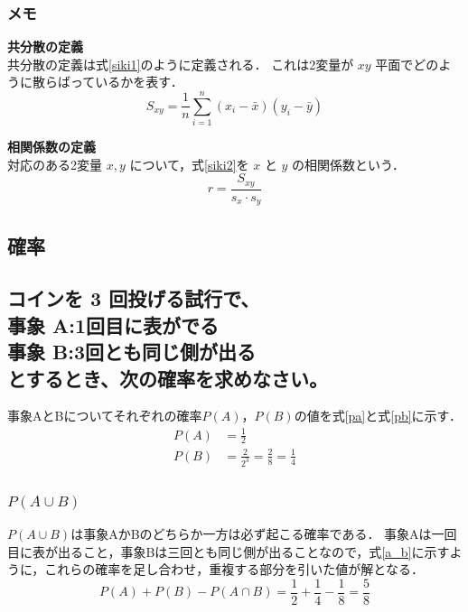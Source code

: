 \documentclass[titlepage,a4paper]{jsarticle}
\begin{document}
\subsubsection*{メモ}

\textbf{共分散の定義}\\
共分散の定義は式\eqref{siki1}のように定義される．
これは2変量が $xy$ 平面でどのように散らばっているかを表す．
\begin{equation}
  S_{xy} = \frac{1}{n} \sum_{i=1}^n (x_i - \bar{x})(y_i - \bar{y})\label{siki1}
\end{equation}


\vspace{1em} %

\textbf{相関係数の定義}\\
対応のある2変量 $x, y$ について，式\eqref{siki2}を $x$ と $y$ の相関係数という．
\begin{equation}
  r = \frac{S_{xy}}{s_x \cdot s_y}\label{siki2}
\end{equation}


\subsection{確率}
\subsection*{コインを 3 回投げる試行で、\\
  \hspace{1em} 事象 A:1回目に表がでる\\
  \hspace{1em} 事象 B:3回とも同じ側が出る\\
  とするとき、次の確率を求めなさい。
}
事象AとBについてそれぞれの確率$P(A)$，$P(B)$の値を式\eqref{pa}と式\eqref{pb}に示す．
\begin{align}
  P(A) & = \frac{1}{2}  \label{pa}                             \\
  P(B) & = \frac{2}{2^3} = \frac{2}{8} = \frac{1}{4}\label{pb}
\end{align}
\subsubsection{$P(A \cup B)$}
$P(A \cup B)$は事象AかBのどちらか一方は必ず起こる確率である．
事象Aは一回目に表が出ること，事象Bは三回とも同じ側が出ることなので，式\eqref{a_b}に示すように，これらの確率を足し合わせ，重複する部分を引いた値が解となる．
\begin{equation}
  P(A) + P(B) - P(A \cap B) = \frac{1}{2} + \frac{1}{4} - \frac{1}{8} = \frac{5}{8}\label{a_b}
\end{equation}
\end{document}
